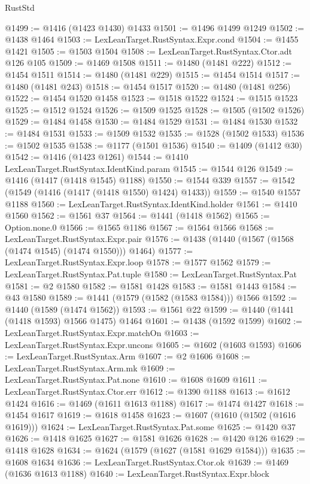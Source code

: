 \begin{lexlean}{RustStd}
\begin{coremodule}
@1499 := @1416 (@1423 @1430) @1433
@1501 := @1496 @1499 @1249
@1502 := @1438 @1464
@1503 := LexLeanTarget.RustSyntax.Expr.cond
@1504 := @1455 @1421
@1505 := @1503 @1504
@1508 := LexLeanTarget.RustSyntax.Ctor.adt @126 @105
@1509 := @1469 @1508
@1511 := @1480 (@1481 @222)
@1512 := @1454 @1511
@1514 := @1480 (@1481 @229)
@1515 := @1454 @1514
@1517 := @1480 (@1481 @243)
@1518 := @1454 @1517
@1520 := @1480 (@1481 @256)
@1522 := @1454 @1520 @1458
@1523 := @1518 @1522
@1524 := @1515 @1523
@1525 := @1512 @1524
@1526 := @1509 @1525
@1528 := @1505 (@1502 @1526)
@1529 := @1484 @1458
@1530 := @1484 @1529
@1531 := @1484 @1530
@1532 := @1484 @1531
@1533 := @1509 @1532
@1535 := @1528 (@1502 @1533)
@1536 := @1502 @1535
@1538 := @1177 (@1501 @1536)
@1540 := @1409 (@1412 @30)
@1542 := @1416 (@1423 @1261)
@1544 := @1410 LexLeanTarget.RustSyntax.IdentKind.param
@1545 := @1544 @126
@1549 := @1416 (@1417 (@1418 @1545) @1188)
@1550 := @1544 @339
@1557 := @1542 (@1549 (@1416 (@1417 (@1418 @1550) @1424) @1433))
@1559 := @1540 @1557 @1188
@1560 := LexLeanTarget.RustSyntax.IdentKind.holder
@1561 := @1410 @1560
@1562 := @1561 @37
@1564 := @1441 (@1418 @1562)
@1565 := Option.none.{0}
@1566 := @1565 @1186
@1567 := @1564 @1566
@1568 := LexLeanTarget.RustSyntax.Expr.pair
@1576 := @1438 (@1440 (@1567 (@1568 (@1474 @1545) (@1474 @1550))) @1464)
@1577 := LexLeanTarget.RustSyntax.Expr.loop
@1578 := @1577 @1562
@1579 := LexLeanTarget.RustSyntax.Pat.tuple
@1580 := LexLeanTarget.RustSyntax.Pat
@1581 := @2 @1580
@1582 := @1581 @1428
@1583 := @1581 @1443
@1584 := @43 @1580
@1589 := @1441 (@1579 (@1582 (@1583 @1584))) @1566
@1592 := @1440 (@1589 (@1474 @1562))
@1593 := @1561 @22
@1599 := @1440 (@1441 (@1418 @1593) @1566 @1475) @1464
@1601 := @1438 (@1592 @1599)
@1602 := LexLeanTarget.RustSyntax.Expr.matchOn
@1603 := LexLeanTarget.RustSyntax.Expr.uncons
@1605 := @1602 (@1603 @1593)
@1606 := LexLeanTarget.RustSyntax.Arm
@1607 := @2 @1606
@1608 := LexLeanTarget.RustSyntax.Arm.mk
@1609 := LexLeanTarget.RustSyntax.Pat.none
@1610 := @1608 @1609
@1611 := LexLeanTarget.RustSyntax.Ctor.err
@1612 := @1390 @1188
@1613 := @1612 @1424
@1616 := @1469 (@1611 @1613 @1188)
@1617 := @1474 @1427
@1618 := @1454 @1617
@1619 := @1618 @1458
@1623 := @1607 (@1610 (@1502 (@1616 @1619)))
@1624 := LexLeanTarget.RustSyntax.Pat.some
@1625 := @1420 @37
@1626 := @1418 @1625
@1627 := @1581 @1626
@1628 := @1420 @126
@1629 := @1418 @1628
@1634 := @1624 (@1579 (@1627 (@1581 @1629 @1584)))
@1635 := @1608 @1634
@1636 := LexLeanTarget.RustSyntax.Ctor.ok
@1639 := @1469 (@1636 @1613 @1188)
@1640 := LexLeanTarget.RustSyntax.Expr.block

\end{coremodule}
\end{lexlean}
